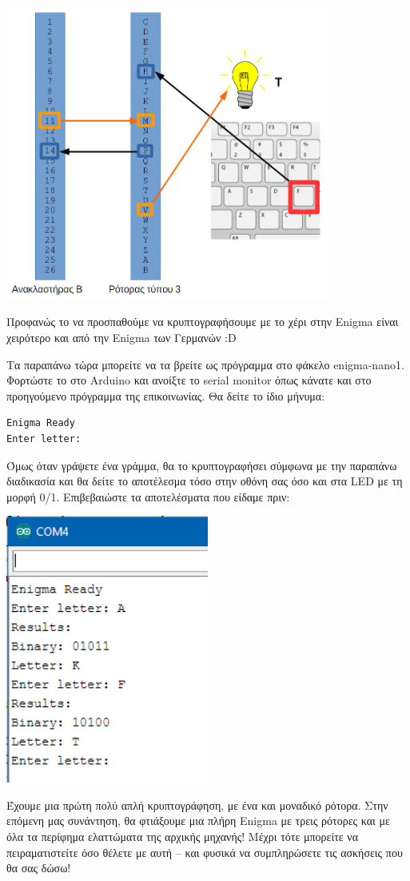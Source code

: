 \documentclass[a4paper,twoside,12pt]{article}
\begin{document}
\begin{center}
  \includegraphics[width=0.8\textwidth]{images/main/enigma-single-rotor1}
\end{center}

Προφανώς το να προσπαθούμε να κρυπτογραφήσουμε με το χέρι στην Enigma είναι χειρότερο και από την Enigma των Γερμανών :D

Τα παραπάνω τώρα μπορείτε να τα βρείτε ως πρόγραμμα στο φάκελο enigma-nano1.  Φορτώστε το στο Arduino και ανοίξτε το serial monitor όπως κάνατε και στο προηγούμενο πρόγραμμα της επικοινωνίας. Θα δείτε το ίδιο μήνυμα:

\begin{verbatim}
Enigma Ready
Enter letter: 
\end{verbatim}

Όμως όταν γράψετε ένα γράμμα, θα το κρυπτογραφήσει σύμφωνα με την παραπάνω διαδικασία και θα δείτε το αποτέλεσμα τόσο στην οθόνη σας όσο και στα LED με τη μορφή 0/1. Επιβεβαιώστε τα αποτελέσματα που είδαμε πριν:

\begin{center}
  \includegraphics[width=0.5\textwidth]{images/main/enigma-nano1-results}
\end{center}

Έχουμε μια πρώτη πολύ απλή κρυπτογράφηση, με ένα και μοναδικό ρότορα. Στην επόμενη μας συνάντηση, θα φτιάξουμε μια πλήρη Enigma με τρεις ρότορες και με όλα τα περίφημα ελαττώματα της αρχικής μηχανής! Μέχρι τότε μπορείτε να πειραματιστείτε όσο θέλετε με αυτή -- και φυσικά να συμπληρώσετε τις ασκήσεις που θα σας δώσω!
\end{document}
